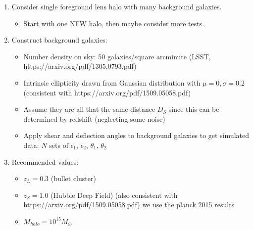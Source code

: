 \documentclass[10pt]{article}
\begin{document}
\begin{enumerate}
    \item Consider single foreground lens halo with many background galaxies.
    \begin{itemize}
        \item Start with one NFW halo, then maybe consider more tests.
    \end{itemize}
    \item Construct background galaxies:
    \begin{itemize}
        \item Number density on sky: 50 galaxies/square arcminute (LSST, https://arxiv.org/pdf/1305.0793.pdf)
        \item Intrinsic ellipticity drawn from Gaussian distribution with $\mu=0, \sigma=0.2$ (consistent with https://arxiv.org/pdf/1509.05058.pdf)
        \item Assume they are all that the same distance $D_S$ since this can be determined by redshift (neglecting some noise)
        \item Apply shear and deflection angles to background galaxies to get simulated data: $N$ sets of $\epsilon_1$, $\epsilon_2$, $\theta_1$, $\theta_2$
    \end{itemize}
    \item Recommended values:
    \begin{itemize}
        \item $z_L = 0.3$ (bullet cluster)
        \item $z_S = 1.0$ (Hubble Deep Field) (also consistent with https://arxiv.org/pdf/1509.05058.pdf)
        we use the planck 2015 results
        \item $M_{halo} = 10^{15} M_\odot$
    \end{itemize}
\end{enumerate}
\end{document}
